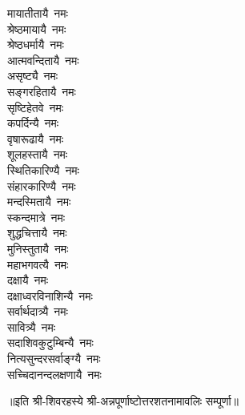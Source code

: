\begin{multicols}{2}
\begin{flushleft}
मायातीतायै~नमः\\
श्रेष्ठमायायै~नमः\\
श्रेष्ठधर्मायै~नमः\\
आत्मवन्दितायै~नमः\\
असृष्ट्यै~नमः\\
सङ्गरहितायै~नमः\hfill{}\\
सृष्टिहेतवे~नमः\\
कपर्दिन्यै~नमः\\
वृषारूढायै~नमः\\
शूलहस्तायै~नमः\\
स्थितिकारिण्यै~नमः\\
संहारकारिण्यै~नमः\\
मन्दस्मितायै~नमः\\
स्कन्दमात्रे~नमः\\
शुद्धचित्तायै~नमः\\
मुनिस्तुतायै~नमः\hfill{}\\
महाभगवत्यै~नमः\\
दक्षायै~नमः\\
दक्षाध्वरविनाशिन्यै~नमः\\
सर्वार्थदात्र्यै~नमः\\
सावित्र्यै~नमः\\
सदाशिवकुटुम्बिन्यै~नमः\\
नित्यसुन्दरसर्वाङ्ग्यै~नमः\\
सच्चिदानन्दलक्षणायै~नमः\\
\end{flushleft}
\end{multicols}
॥इति श्री-शिवरहस्ये श्री-अन्नपूर्णाष्टोत्तर\-शतनामावलिः सम्पूर्णा॥
